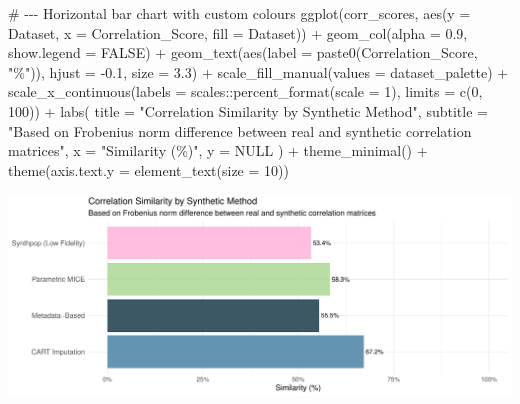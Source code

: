 \documentclass[
  letterpaper,
  DIV=11,
  numbers=noendperiod]{scrartcl}
\newenvironment{Shaded}{\begin{snugshade}}{\end{snugshade}}
\newcommand{\AttributeTok}[1]{\textcolor[rgb]{0.40,0.45,0.13}{#1}}
\newcommand{\CommentTok}[1]{\textcolor[rgb]{0.37,0.37,0.37}{#1}}
\newcommand{\ConstantTok}[1]{\textcolor[rgb]{0.56,0.35,0.01}{#1}}
\newcommand{\DecValTok}[1]{\textcolor[rgb]{0.68,0.00,0.00}{#1}}
\newcommand{\FloatTok}[1]{\textcolor[rgb]{0.68,0.00,0.00}{#1}}
\newcommand{\FunctionTok}[1]{\textcolor[rgb]{0.28,0.35,0.67}{#1}}
\newcommand{\NormalTok}[1]{\textcolor[rgb]{0.00,0.23,0.31}{#1}}
\newcommand{\SpecialCharTok}[1]{\textcolor[rgb]{0.37,0.37,0.37}{#1}}
\newcommand{\StringTok}[1]{\textcolor[rgb]{0.13,0.47,0.30}{#1}}
\begin{document}
\begin{Shaded}
\begin{Highlighting}[]
\CommentTok{\# {-}{-}{-} Horizontal bar chart with custom colours}
\FunctionTok{ggplot}\NormalTok{(corr\_scores, }\FunctionTok{aes}\NormalTok{(}\AttributeTok{y =}\NormalTok{ Dataset, }\AttributeTok{x =}\NormalTok{ Correlation\_Score, }\AttributeTok{fill =}\NormalTok{ Dataset)) }\SpecialCharTok{+}
  \FunctionTok{geom\_col}\NormalTok{(}\AttributeTok{alpha =} \FloatTok{0.9}\NormalTok{, }\AttributeTok{show.legend =} \ConstantTok{FALSE}\NormalTok{) }\SpecialCharTok{+}
  \FunctionTok{geom\_text}\NormalTok{(}\FunctionTok{aes}\NormalTok{(}\AttributeTok{label =} \FunctionTok{paste0}\NormalTok{(Correlation\_Score, }\StringTok{"\%"}\NormalTok{)), }
            \AttributeTok{hjust =} \SpecialCharTok{{-}}\FloatTok{0.1}\NormalTok{, }\AttributeTok{size =} \FloatTok{3.3}\NormalTok{) }\SpecialCharTok{+}
  \FunctionTok{scale\_fill\_manual}\NormalTok{(}\AttributeTok{values =}\NormalTok{ dataset\_palette) }\SpecialCharTok{+}
  \FunctionTok{scale\_x\_continuous}\NormalTok{(}\AttributeTok{labels =}\NormalTok{ scales}\SpecialCharTok{::}\FunctionTok{percent\_format}\NormalTok{(}\AttributeTok{scale =} \DecValTok{1}\NormalTok{), }\AttributeTok{limits =} \FunctionTok{c}\NormalTok{(}\DecValTok{0}\NormalTok{, }\DecValTok{100}\NormalTok{)) }\SpecialCharTok{+}
  \FunctionTok{labs}\NormalTok{(}
    \AttributeTok{title =} \StringTok{"Correlation Similarity by Synthetic Method"}\NormalTok{,}
    \AttributeTok{subtitle =} \StringTok{"Based on Frobenius norm difference between real and synthetic correlation matrices"}\NormalTok{,}
    \AttributeTok{x =} \StringTok{"Similarity (\%)"}\NormalTok{, }\AttributeTok{y =} \ConstantTok{NULL}
\NormalTok{  ) }\SpecialCharTok{+}
  \FunctionTok{theme\_minimal}\NormalTok{() }\SpecialCharTok{+}
  \FunctionTok{theme}\NormalTok{(}\AttributeTok{axis.text.y =} \FunctionTok{element\_text}\NormalTok{(}\AttributeTok{size =} \DecValTok{10}\NormalTok{))}
\end{Highlighting}
\end{Shaded}

\begin{center}
\includegraphics[width=1\linewidth,height=\textheight,keepaspectratio]{heart_failure_synthetic_data_project_files/figure-pdf/correlation-score-1.pdf}
\end{center}
\end{document}
